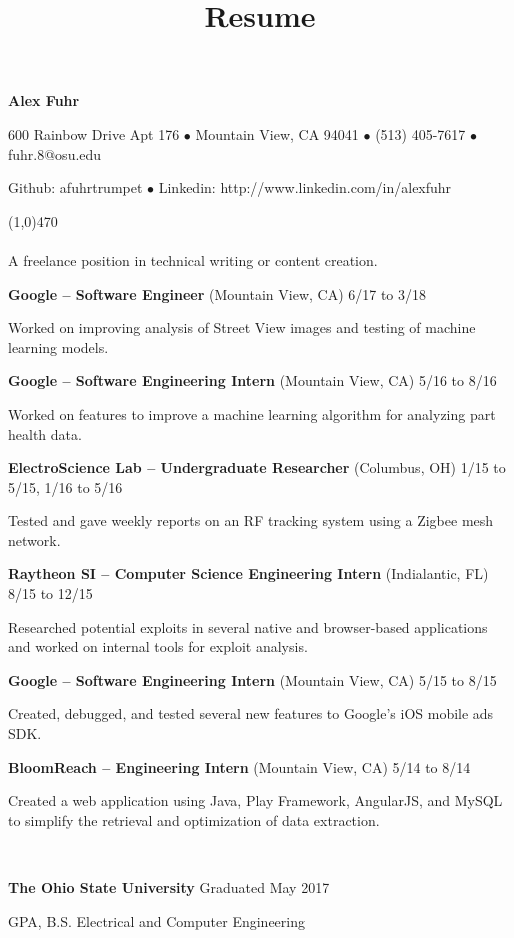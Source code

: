 \documentclass[10pt]{article}
\title{Resume}
\begin{document}
\centerline{{\LARGE \bf Alex Fuhr}}
\centerline{600 Rainbow Drive Apt 176 $\bullet$ Mountain View, CA 94041 $\bullet$ (513) 405-7617 $\bullet$ fuhr.8@osu.edu}
\centerline{Github: afuhrtrumpet $\bullet$ Linkedin: http://www.linkedin.com/in/alexfuhr}
\noindent
\line(1,0){470}\\

\\
\smallskip
\noindent
A freelance position in technical writing or content creation.
\medskip

\smallskip

\centerline{{\large {\bf Google -- Software Engineer} (Mountain View, CA) \hfill 6/17 to 3/18}}
\noindent
Worked on improving analysis of Street View images and testing of machine learning models.
\smallskip

\centerline{{\large {\bf Google -- Software Engineering Intern} (Mountain View, CA) \hfill 5/16 to 8/16}}
\noindent
Worked on features to improve a machine learning algorithm for analyzing part health data.
\smallskip

\centerline{{\large {\bf ElectroScience Lab -- Undergraduate Researcher} (Columbus, OH) \hfill 1/15 to 5/15, 1/16 to 5/16}}
\noindent
Tested and gave weekly reports on an RF tracking system using a Zigbee mesh network.
\smallskip

\centerline{{\large {\bf Raytheon SI -- Computer Science Engineering Intern} (Indialantic, FL) \hfill 8/15 to 12/15}}
\noindent
Researched potential exploits in several native and browser-based applications and worked on internal tools for exploit analysis.
\smallskip

\centerline{{\large {\bf Google -- Software Engineering Intern} (Mountain View, CA) \hfill 5/15 to 8/15}}
\noindent
Created, debugged, and tested several new features to Google's iOS mobile ads SDK.
\smallskip

\centerline{{\large {\bf BloomReach -- Engineering Intern} (Mountain View, CA) \hfill 5/14 to 8/14}}
\noindent
Created a web application using Java, Play Framework, AngularJS, and MySQL to simplify the retrieval and optimization of data extraction.
\medskip

\\
\smallskip
\centerline{{\large {\bf The Ohio State University} \hfill Graduated May 2017}}
 GPA, B.S. Electrical and Computer Engineering
\medskip
\end{document}
